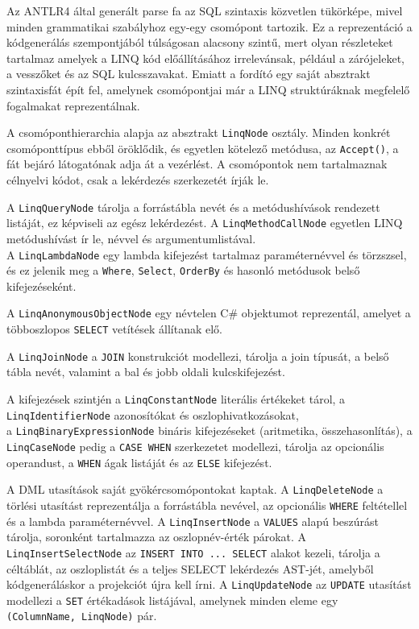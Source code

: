 
Az ANTLR4 által generált parse fa az SQL szintaxis közvetlen tükörképe, mivel minden grammatikai szabályhoz egy-egy csomópont tartozik. Ez a reprezentáció a kódgenerálás szempontjából túlságosan alacsony szintű, mert olyan részleteket tartalmaz amelyek a LINQ kód előállításához irrelevánsak, például a zárójeleket, a vesszőket és az SQL kulcsszavakat. Emiatt a fordító egy saját absztrakt szintaxisfát épít fel, amelynek csomópontjai már a LINQ struktúráknak megfelelő fogalmakat reprezentálnak.

A csomóponthierarchia alapja az absztrakt \texttt{LinqNode} osztály. Minden konkrét csomóponttípus ebből öröklődik, és egyetlen kötelező metódusa, az \texttt{Accept()}, a fát bejáró látogatónak adja át a vezérlést. A csomópontok nem tartalmaznak célnyelvi kódot, csak a lekérdezés szerkezetét írják le.

A \texttt{LinqQueryNode} tárolja a forrástábla nevét és a metódushívások rendezett listáját, ez képviseli az egész lekérdezést. A \texttt{LinqMethodCallNode} egyetlen LINQ metódushívást ír le, névvel és argumentumlistával. \\A \texttt{LinqLambdaNode} egy lambda kifejezést tartalmaz paraméternévvel és törzs\-zsel, és ez jelenik meg a \texttt{Where}, \texttt{Select}, \texttt{OrderBy} és hasonló metódusok belső kifejezéseként.

A \texttt{LinqAnonymousObjectNode} egy névtelen C\# objektumot reprezentál, amelyet a többoszlopos \texttt{SELECT} vetítések állítanak elő.

A \texttt{LinqJoinNode} a \texttt{JOIN} konstrukciót modellezi, tárolja a join típusát, a belső tábla nevét, valamint a bal és jobb oldali kulcskifejezést.

A kifejezések szintjén a \texttt{LinqConstantNode} literális értékeket tárol, a \\ \texttt{LinqIdentifierNode} azonosítókat és oszlophivatkozásokat, \\a \texttt{LinqBinaryExpressionNode} bináris kifejezéseket (aritmetika, összehasonlítás), a \\ \texttt{LinqCaseNode} pedig a \texttt{CASE WHEN} szerkezetet modellezi, tárolja az opcionális operandust, a \texttt{WHEN} ágak listáját és az \texttt{ELSE} kifejezést.

A DML utasítások saját gyökércsomópontokat kaptak. A \texttt{LinqDeleteNode} a törlési utasítást reprezentálja a forrástábla nevével, az opcionális \texttt{WHERE} feltétellel és a lambda paraméternévvel. A \texttt{LinqInsertNode} a \texttt{VALUES} alapú beszúrást tárolja, soronként tartalmazza az oszlopnév-érték párokat. A \texttt{LinqInsertSelectNode} az \texttt{INSERT INTO ... SELECT} alakot kezeli, tárolja a céltáblát, az oszloplistát és a teljes SELECT lekérdezés AST-jét, amelyből kódgeneráláskor a projekciót újra kell írni. A \texttt{LinqUpdateNode} az \texttt{UPDATE} utasítást modellezi a \texttt{SET} értékadások listájával, amelynek minden eleme egy \\ \texttt{(ColumnName, LinqNode)} pár.

